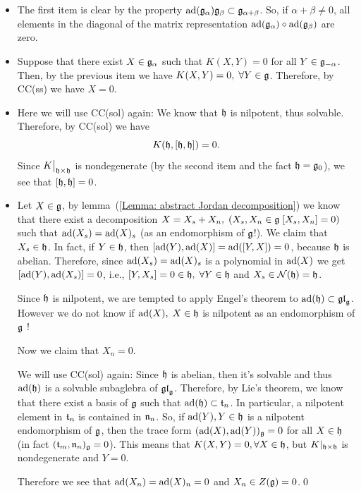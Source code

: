\begin{itemize}
    \item[1.] The first item is clear by the property $\text{ad}(\mathfrak{g}_\alpha)\mathfrak{g}_\beta\subset \mathfrak{g}_{\alpha+\beta}$. So, if 
$\alpha+\beta\neq0$, all elements in the diagonal of the matrix representation $\text{ad}(\mathfrak{g}_\alpha)\circ\text{ad}(\mathfrak{g}_\beta)$ 
are zero. 
\item[2.] Suppose that there exist $X\in\mathfrak{g}_\alpha$ such that $K(X,Y)=0$ for all $Y\in\mathfrak{g}_{-\alpha}$. Then, by the 
previous item we have $K(X,Y)=0,\;\forall Y\in\mathfrak{g}$. Therefore, by CC(ss) we have $X=0$.
\item[3.] Here we will use CC(sol) again: We know that $\mathfrak{h}$ is nilpotent, thus solvable. Therefore, by CC(sol) we have 
\begin{equation}
    K(\mathfrak{h},[\mathfrak{h},\mathfrak{h}])=0.
\end{equation}
Since $K\big|_{\mathfrak{h}\times\mathfrak{h}}$ is nondegenerate 
(by the second item and the fact $\mathfrak{h}=\mathfrak{g}_0$), we see that $[\mathfrak{h},\mathfrak{h}]=0$.
\item[4.]  Let $X\in\mathfrak{g}$, by lemma~(\ref{Lemma: abstract Jordan decomposition}) we know that there exist 
a decomposition $X=X_s+X_n,\;(X_s,X_n\in\mathfrak{g}\; [X_s,X_n]=0)$ 
such that $\text{ad}(X_s)=\text{ad}(X)_s$ (as an endomorphism of $\mathfrak{g}$!). We claim that $X_s\in\mathfrak{h}$. In fact, if $Y\in\mathfrak{h}$, then 
$[\text{ad}(Y),\text{ad}(X)]=\text{ad}([Y,X])=0$, because $\mathfrak{h}$ is abelian. Therefore, since $\text{ad}(X_s)=\text{ad}(X)_s$ is a polynomial in 
$\text{ad}(X)$ we get $[\text{ad}(Y),\text{ad}(X_s)]=0$, i.e., 
$[Y,X_s]=0\in \mathfrak{h},\;\forall Y\in\mathfrak{h}$ and $X_s\in\mathcal{N}(\mathfrak{h})=\mathfrak{h}$.
\begin{dang}
    Since $\mathfrak{h}$ is nilpotent, we are tempted to apply Engel's theorem to $\text{ad}(\mathfrak{h})\subset\mathfrak{gl}_{\mathfrak{g}}$. However
we do not know if $\text{ad}(X),\;X\in\mathfrak{h}$ is nilpotent as an endomorphism of $\mathfrak{g}$ !
\end{dang}

Now we claim that $X_n=0$.\par

We will use CC(sol) again:
Since $\mathfrak{h}$ is abelian, then it's solvable and thus $\text{ad}(\mathfrak{h})$ is a solvable subaglebra of $\mathfrak{gl}_{\mathfrak{g}}$. 
Therefore, by Lie's theorem, we know that there exist a basis of $\mathfrak{g}$ such that 
$\text{ad}(\mathfrak{h})\subset \mathfrak{t}_n$. In particular, a nilpotent element in $\mathfrak{t}_n$ is contained in $\mathfrak{n}_n$. So, if 
$\text{ad}(Y),Y\in\mathfrak{h}$ is a nilpotent endomorphism of $\mathfrak{g}$, then the trace form $(\text{ad}(X),\text{ad}(Y))_{\mathfrak{g}}=0$ for all
$X\in \mathfrak{h}$ (in fact $(\mathfrak{t}_m,\mathfrak{n}_n)_{\mathfrak{g}}=0$). This means that $K(X,Y)=0,\forall X\in\mathfrak{h}$, but 
$K|_{\mathfrak{h}\times\mathfrak{h}}$ is nondegenerate and $Y=0$.\par

Therefore we see that $\text{ad}(X_n)=\text{ad}(X)_n=0$ and $X_n\in Z(\mathfrak{g})=0$.\qed
\end{itemize}
 

